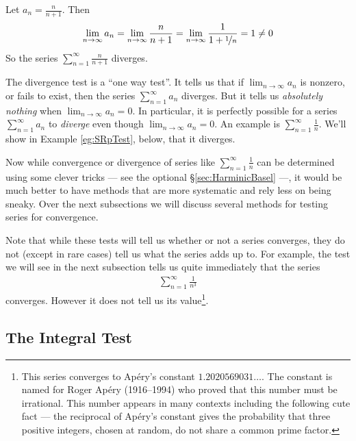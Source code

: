 \begin{eg}\label{eg:SRdivTest}
Let $a_n=\frac{n}{n+1}$. Then
\begin{equation*}
\lim_{n\rightarrow\infty} a_n
=\lim_{n\rightarrow\infty}\frac{n}{n+1}
=\lim_{n\rightarrow\infty}\frac{1}{1+\nicefrac{1}{n}}
=1\ne 0
\end{equation*}
So the series $\sum_{n=1}^\infty \frac{n}{n+1}$ diverges.

\end{eg}

\begin{warning}\label{wrn:SRdivTest}
The divergence test is a ``one way test''. It tells us that if
$\lim_{n\rightarrow\infty}a_n$ is nonzero, or fails to exist, then
the series $\sum_{n=1}^\infty a_n$ diverges. But it tells us \emph{absolutely
nothing} when $\lim_{n\rightarrow\infty}a_n=0$. In particular, it is perfectly
possible for a series $\sum_{n=1}^\infty a_n$ to \emph{diverge} even
though  $\lim_{n\rightarrow\infty}a_n=0$.
An example is $\sum_{n=1}^\infty \frac{1}{n}$. We'll show in Example
\ref{eg:SRpTest}, below, that it diverges.
\end{warning}


Now while convergence or divergence of series like
$\sum_{n=1}^\infty \frac{1}{n}$ can be determined using some
clever tricks --- see the optional \S\ref{sec:HarminicBasel} ---,
it would be much better to have methods that are more systematic and
rely less on being sneaky. Over the next subsections we will discuss
several methods for testing series for convergence.


Note that while these tests will tell us whether or not a series
converges, they do not (except in rare cases) tell us what the
series adds up to. For example, the test we will
see in the next subsection tells us quite immediately that the series
\begin{align*}
  \sum_{n=1}^\infty \frac{1}{n^3}
\end{align*}
converges. However it does not tell us its value\footnote{This series
converges to Ap\'ery's constant $1.2020569031\dots$. The constant is
named for Roger Ap\'ery (1916--1994) who proved that this number must be irrational. This number appears in many contexts including the following
cute fact --- the reciprocal of Ap\'ery's constant gives the probability
that three positive integers, chosen at random, do not share
a common prime factor.}.


\subsection{The Integral Test}

